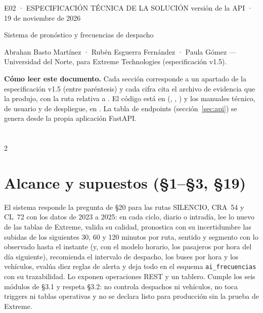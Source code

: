 \documentclass[10pt,a4paper]{article}
\makeatletter
\newcommand{\indicedoscolumnas}{\section*{\contentsname}\begin{multicols}{2}\@starttoc{toc}\end{multicols}}
\makeatother
\begin{document}
\thispagestyle{fancy}
{\footnotesize\color{rol-tinta-3}E02 · ESPECIFICACIÓN TÉCNICA DE LA SOLUCIÓN \hfill versión de la API \VersionAPI{} · 19 de
noviembre de 2026}\par\vspace{4pt}
{\interligera\fontsize{22}{26}\selectfont Sistema de pronóstico y frecuencias de despacho\par}
\vspace{2pt}
{\large{}\par}
\vspace{4pt}
{\small Abrahan Basto Martínez · Rubén Esguerra Fernández · Paula Gómez — Universidad del Norte, para Extreme
Technologies (especificación v1.5).\par}
\vspace{6pt}

\begin{tarjeta}
\small\textbf{Cómo leer este documento.} Cada sección corresponde a un apartado de la especificación v1.5 (entre
paréntesis) y cada cifra cita el archivo de evidencia que la produjo, con la ruta relativa a . El
código está en  (, , ) y los manuales técnico,
de usuario y de despliegue, en . La tabla de endpoints (sección~\ref{sec:api}) se genera
desde la propia aplicación FastAPI.
\end{tarjeta}

{\small\indicedoscolumnas}

\section{Alcance y supuestos (§1--§3, §19)}
El sistema responde la pregunta de §20 para las rutas SILENCIO, CRA~54 y CL~72 con los datos de 2023 a 2025: en cada
ciclo, diario o intradía, lee lo nuevo de las tablas de Extreme, valida su calidad, pronostica con su incertidumbre las subidas de los siguientes
30, 60 y 120 minutos por ruta, sentido y segmento con lo observado hasta el instante (y, con el modelo horario, los
pasajeros por hora del día siguiente), recomienda el intervalo de despacho, los buses por hora y los vehículos, evalúa
diez reglas de alerta y deja todo en el esquema \texttt{ai\_frecuencias} con su trazabilidad. Lo exponen
\NOperaciones{} operaciones REST y un tablero. Cumple los seis módulos de §3.1 y respeta §3.2: no controla despachos ni
vehículos, no toca triggers ni tablas operativas y no se declara listo para producción sin la prueba de Extreme.
\end{document}
